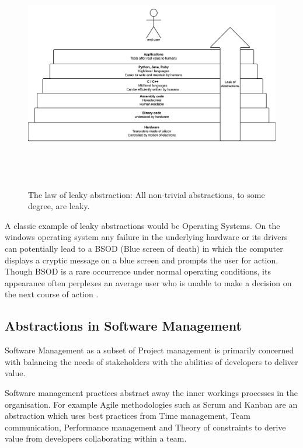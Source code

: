 \documentclass[12pt,conference]{IEEEtran}
\begin{document}
\begin{figure}
  \centering
  \includegraphics[height=4in]{leakyabstraction}
  \caption{The law of leaky abstraction: All non-trivial abstractions, to some degree, are leaky.}
  \label{leakyabstraction}
\end{figure}

A classic example of leaky abstractions would be Operating Systems. On the windows operating system any failure in the underlying hardware or its drivers can potentially lead to a BSOD (Blue screen of death) in which the computer displays a cryptic message on a blue screen and prompts the user for action. Though BSOD is a rare occurrence under normal operating conditions, its appearance often perplexes an average user who is unable to make a decision on the next course of action \cite{rosenberg_law_2007}. 

\subsection*{Abstractions in Software Management}

Software Management as a subset of Project management is primarily concerned with balancing the needs of stakeholders with the abilities of developers to deliver value.

Software management practices abstract away the inner workings processes in the organisation. For example Agile methodologies such as Scrum and Kanban are an abstraction which uses best practices from Time management, Team communication, Performance management and Theory of constraints to derive value from developers collaborating within a team. 
\end{document}
